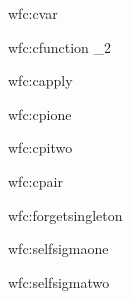 \documentclass{article}
\theoremstyle{break}
\begin{document}
  {wfc:cvar}
  {\validcontext{\context}}
  {\validconstructor{\context}{\cvar}{\context(\cvar)}}

  {wfc:cfunction}
  {
          {\constructor}{\kind_2}}
  {\validconstructor{\context}
     {}
     {}}

  {wfc:capply}
  {
   \qquad
   }
  {
      {}}

  {wfc:cpione}
  {}
  {}

  {wfc:cpitwo}
  {}
  {
          {}}

  {wfc:cpair}
  {\qquad
   \qquad
    {}}
  {
      {}}

  {wfc:forgetsingleton}
  {\validconstructor{\context}{\constructor}{\ktype}}
  {\validconstructor{\context}{\constructor}{\ksingleton{\constructor}}}

  {wfc:selfsigmaone}
  {\validconstructor{\context}{\constructor}
                       {}\qquad
      }
  {\validconstructor{\context}{\constructor}
                       {}}

  {wfc:selfsigmatwo}
  {\validconstructor{\context}{\constructor}
                       {}\qquad
      }
  {\validconstructor{\context}{\constructor}
                       {}}
\end{document}
